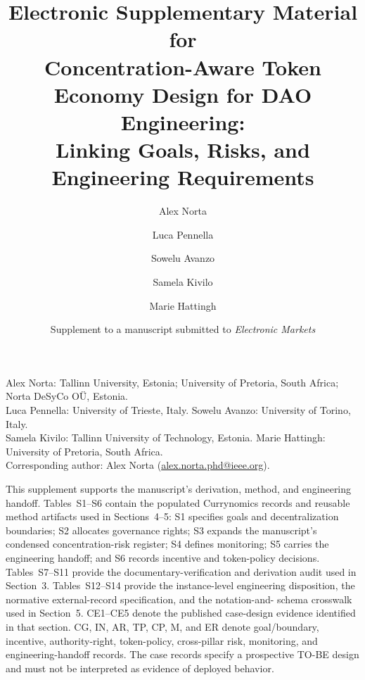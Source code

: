 \documentclass[10pt]{article}
\title{Electronic Supplementary Material for\\
Concentration-Aware Token Economy Design for DAO Engineering:\\
Linking Goals, Risks, and Engineering Requirements}
\author{Alex Norta \and Luca Pennella \and Sowelu Avanzo \and
Samela Kivilo \and Marie Hattingh}
\date{Supplement to a manuscript submitted to \emph{Electronic Markets}}
\begin{document}
\maketitle

\begin{center}
\small
Alex Norta: Tallinn University, Estonia; University of Pretoria, South Africa;
Norta DeSyCo OÜ, Estonia.\\
Luca Pennella: University of Trieste, Italy.\quad
Sowelu Avanzo: University of Torino, Italy.\\
Samela Kivilo: Tallinn University of Technology, Estonia.\quad
Marie Hattingh: University of Pretoria, South Africa.\\[2pt]
Corresponding author: Alex Norta (\href{mailto:alex.norta.phd@ieee.org}{alex.norta.phd@ieee.org}).
\end{center}

This supplement supports the manuscript's derivation, method, and engineering
handoff. Tables~S1--S6 contain the populated Currynomics records and reusable
method artifacts used in Sections~4--5: S1 specifies goals and decentralization
boundaries; S2 allocates governance rights; S3 expands the manuscript's
condensed concentration-risk register; S4 defines monitoring; S5 carries the
engineering handoff; and S6 records incentive and token-policy decisions.
Tables~S7--S11 provide the documentary-verification and derivation audit used
in Section~3. Tables~S12--S14 provide the instance-level engineering
disposition, the normative external-record specification, and the notation-and-
schema crosswalk used in Section~5. CE1--CE5 denote the published case-design evidence identified in
that section. CG, IN, AR, TP, CP, M, and ER denote goal/boundary, incentive,
authority-right, token-policy, cross-pillar risk, monitoring, and
engineering-handoff records. The case records specify a prospective TO-BE
design and must not be interpreted as evidence of deployed behavior.
\end{document}
